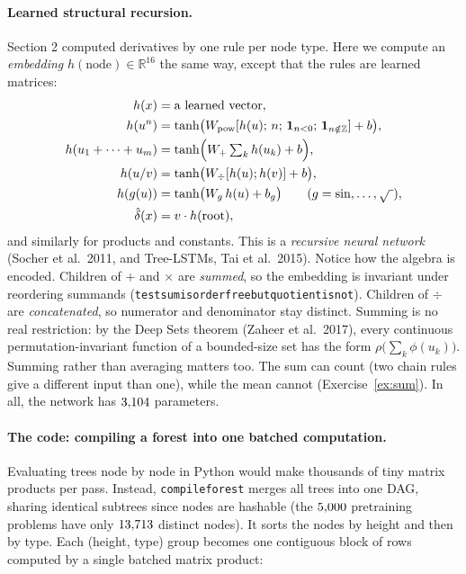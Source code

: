 \documentclass[11pt]{article}
\theoremstyle{definition}
\theoremstyle{plain}
\theoremstyle{remark}
\newcommand{\R}{\mathbb{R}}
\newcommand{\code}[1]{\texttt{#1}}
\renewcommand{\_}{\oldunderscore\allowbreak}
\begin{document}
\paragraph{Learned structural recursion.}
Section 2 computed derivatives by one rule per node type. Here we compute an \emph{embedding} $h(\text{node})\in\R^{16}$ the same way, except
that the rules are learned matrices:
\[
\begin{aligned}
  h(x)&=\text{a learned vector},\\
  h(u^n)&=\tanh\bigl(W_{\text{pow}}[h(u);\,n;\,\mathbf 1_{n<0};\,\mathbf 1_{n\notin\mathbb Z}]+b\bigr),\\
  h(u_1+\dots+u_m)&=\tanh\Bigl(W_{+}\textstyle\sum_kh(u_k)+b\Bigr),\\
  h(u/v)&=\tanh\bigl(W_{\div}[h(u);h(v)]+b\bigr),\\
  h(g(u))&=\tanh\bigl(W_g\,h(u)+b_g\bigr)\qquad(g=\sin,\dots,\sqrt{\ }),\\
  \hat\delta(x)&=v\cdot h(\text{root}),
\end{aligned}
\]
and similarly for products and constants. This is a \emph{recursive neural network} (Socher et al.\ 2011, and Tree-LSTMs, Tai et al.\ 2015).
Notice how the algebra is encoded. Children of $+$ and $\times$ are \emph{summed}, so the embedding is invariant under reordering summands
(\code{test\_sum\_is\_order\_free\_but\_quotient\_is\_not}). Children of $\div$ are \emph{concatenated}, so numerator and denominator stay distinct. Summing is no real
restriction: by the Deep Sets theorem (Zaheer et al.\ 2017), every continuous permutation-invariant function of a bounded-size set has the form $\rho\bigl(\sum_k\phi(u_k)\bigr)$.
Summing rather than averaging matters too. The sum can count (two chain rules give a different input than one), while the mean cannot (Exercise~\ref{ex:sum}).
In all, the network has $3{,}104$ parameters.

\paragraph{The code: compiling a forest into one batched computation.}
Evaluating trees node by node in Python would make thousands of tiny matrix products per pass. Instead, \code{compile\_forest} merges all trees into one
DAG, sharing identical subtrees since nodes are hashable (the $5{,}000$ pretraining problems have only $13{,}713$ distinct nodes). It sorts the nodes by height and then by type.
Each (height, type) group becomes one contiguous block of rows computed by a single batched matrix product:
\end{document}
